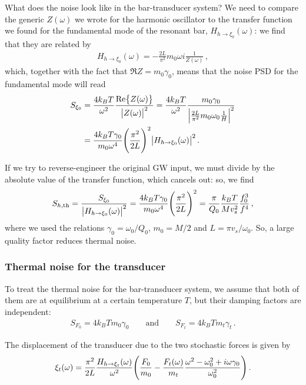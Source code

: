 \documentclass[main.tex]{subfiles}
\begin{document}
What does the noise look like in the bar-transducer system?
We need to compare the generic \(Z(\omega )\) we wrote for the harmonic oscillator to the transfer function we found for the fundamental mode of the resonant bar, \(H_{h \to \xi_0  } (\omega )\): we find that they are related by 
%
\begin{align}
H_{h \to \xi_0 } (\omega ) = - \frac{2L}{\pi^2} m_0 \omega i \frac{1}{Z(\omega )}
\,,
\end{align}
%
which, together with the fact that \(\Re{Z} = m_0 \gamma_0 \), means that the noise PSD for the fundamental mode will read 
%
\begin{align}
S_{\xi_0 } 
&= \frac{4k_BT}{\omega^2} \frac{\Re{Z(\omega )}}{\abs{Z(\omega )}^2}  
= \frac{4k_BT}{\omega^2 } \frac{m_0 \gamma_0 }{\abs{ \frac{2L}{\pi^2} m_0 \omega_0  \frac{1}{H}}^2}
\\
&= \frac{4 k_B T \gamma_0 }{m_0 \omega^{4}} 
\qty(\frac{\pi^2}{2L})^2 \abs{H_{h \to \xi_0 } (\omega )}^2
\,.
\end{align}

If we try to reverse-engineer the original GW input, we must divide by the absolute value of the transfer function, which cancels out: so, we find 
%
\begin{align}
S_{h, \text{th}} = \frac{S_{\xi_0 }}{\abs{H_{h \to \xi_0 } (\omega )}^2}
= \frac{4 k_B T \gamma_0 }{m_0 \omega^{4}} 
\qty(\frac{\pi^2}{2L})^2
= \frac{\pi}{Q_0 } \frac{k_B T}{M v_s^2} \frac{f_0^3}{f^{4}}
\,,
\end{align}
%
where we used the relations \(\gamma_0 = \omega_0 / Q_0 \), \(m_0 = M / 2\) and \(L = \pi v_s / \omega_0 \).
So, a large quality factor reduces thermal noise.

\subsubsection{Thermal noise for the transducer}

To treat the thermal noise for the bar-transducer system, we assume that both of them are at equilibrium at a certain temperature \(T\), but their damping factors are independent: 
%
\begin{align}
S_{F_0 } = 4 k_B T m_0 \gamma_0 \qquad \text{and} \qquad
S_{F_t} = 4 k_B T m_t \gamma_{t}
\,.
\end{align}

The displacement of the transducer due to the two stochastic forces is given by 
%
\begin{align}
\xi_{t} (\omega ) = \frac{\pi^2}{2L} \frac{H_{h \to \xi_{t} } (\omega )}{\omega^2} \qty(\frac{F_0 }{m_0 } - \frac{F_t (\omega )}{m_t} \frac{\omega^2 - \omega_0^2 + i \omega \gamma_0 }{\omega_0^2})
\,.
\end{align}
\end{document}
